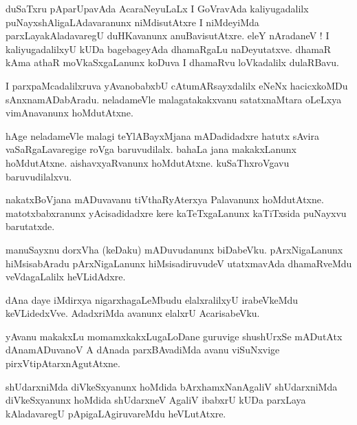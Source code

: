 \documentclass{article}
\begin{document}
\begin{mn}%
duSaTxru pAparUpavAda AcaraNeyuLaLx I GoVravAda kaliyugadalilx puNayxshAligaLAdavaranunx 
niMdisutAtxre I niMdeyiMda parxLayakAladavaregU duHKavanunx anuBavisutAtxre. eleY nAradaneV ! I 
kaliyugadalilxyU kUDa bagebageyAda dhamaRgaLu naDeyutatxve. dhamaR kAma athaR moVkaSxgaLanunx 
koDuva I dhamaRvu loVkadalilx dulaRBavu.
\end{mn}

\begin{mn}%
I parxpaMcadalilxruva yAvanobabxbU cAtumARsayxdalilx eNeNx hacicxkoMDu sAnxnamADabAradu. neladameVle 
malagatakakxvanu satatxnaMtara oLeLxya vimAnavanunx hoMdutAtxne.
\end{mn}

\begin{mn}%
hAge neladameVle malagi teYlABayxMjana mADadidadxre hatutx sAvira vaSaRgaLavaregige roVga 
baruvudilalx. bahaLa jana makakxLanunx hoMdutAtxne. aishavxyaRvanunx hoMdutAtxne. kuSaThxroVgavu 
baruvudilalxvu.
\end{mn}

\begin{mn}%
nakatxBoVjana mADuvavanu tiVthaRyAterxya Palavanunx hoMdutAtxne. matotxbabxranunx yAcisadidadxre 
kere kaTeTxgaLanunx kaTiTxsida puNayxvu barutatxde.
\end{mn}

\begin{mn}%
manuSayxnu dorxVha (keDaku) mADuvudanunx biDabeVku. pArxNigaLanunx hiMsisabAradu pArxNigaLanunx 
hiMsisadiruvudeV utatxmavAda dhamaRveMdu veVdagaLalilx heVLidAdxre.
\end{mn}

\begin{mn}%
dAna daye iMdirxya nigarxhagaLeMbudu elalxralilxyU irabeVkeMdu keVLidedxVve. AdadxriMda avanunx 
elalxrU AcarisabeVku.
\end{mn}

\begin{mn}%
yAvanu makakxLu momamxkakxLugaLoDane guruvige shushUrxSe mADutAtx dAnamADuvanoV A dAnada 
parxBAvadiMda avanu viSuNxvige pirxVtipAtarxnAgutAtxne.
\end{mn}

\begin{mn}%
shUdarxniMda diVkeSxyanunx hoMdida bArxhamxNanAgaliV shUdarxniMda diVkeSxyanunx hoMdida shUdarxneV 
AgaliV ibabxrU kUDa parxLaya kAladavaregU pApigaLAgiruvareMdu heVLutAtxre.
\end{mn}
\end{document}
